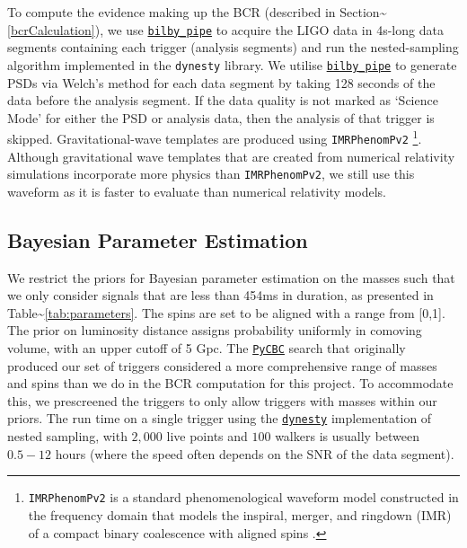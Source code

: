 \documentclass[%
 reprint,
 amsmath,amssymb,
 aps,
]{revtex4}
\begin{document}
To compute the evidence making up the BCR (described in Section\textasciitilde\ref{bcrCalculation}), we use \href{https://lscsoft.docs.ligo.org/bilby_pipe/}{\texttt{bilby\_pipe}} to acquire
the LIGO data in 4s-long data segments containing each trigger (analysis segments) and run the nested-sampling algorithm
implemented in the \texttt{dynesty} library. We utilise \href{https://lscsoft.docs.ligo.org/bilby_pipe/}{\texttt{bilby\_pipe}} to generate PSDs via Welch's method for each data
segment by taking 128 seconds of the data before the analysis segment. If the data quality is not marked as `Science
Mode' for either the PSD or analysis data, then the analysis of that trigger is skipped. Gravitational-wave templates
are produced using \texttt{IMRPhenomPv2} \footnote{\texttt{IMRPhenomPv2} is a standard phenomenological waveform model constructed in the
  frequency domain that models the inspiral, merger, and ringdown (IMR) of a compact binary coalescence with aligned spins
  \citep{khan2016frequency}.}. Although gravitational wave templates that are created from numerical relativity simulations
incorporate more physics than \texttt{IMRPhenomPv2}, we still use this waveform as it is faster to evaluate than numerical
relativity models.

\hypertarget{bayesian-parameter-estimation}{%
\subsection{Bayesian Parameter Estimation}\label{bayesian-parameter-estimation}}

We restrict the priors for Bayesian parameter estimation on the masses such that we only consider signals that are less
than 454ms in duration, as presented in Table\textasciitilde\ref{tab:parameters}. The spins are set to be aligned with a range from
{[}0,1{]}. The prior on luminosity distance assigns probability uniformly in comoving volume, with an upper cutoff of 5 Gpc.
The \href{https://pycbc.org/}{\texttt{PyCBC}} search that originally produced our set of triggers considered a more comprehensive range of masses and
spins than we do in the BCR computation for this project. To accommodate this, we prescreened the triggers to only allow
triggers with masses within our priors. The run time on a single trigger using the \href{https://arxiv.org/abs/1904.02180}{\texttt{dynesty}} implementation of nested
sampling, with \(2,000\) live points and \(100\) walkers is usually between \(0.5-12\) hours (where the speed often depends on
the SNR of the data segment).
\end{document}
